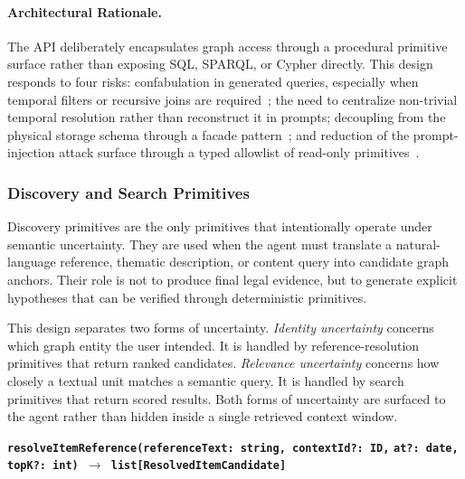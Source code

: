 \documentclass[11pt]{article}
\begin{document}
\paragraph{Architectural Rationale.}
The API deliberately encapsulates graph access through a procedural primitive surface rather than exposing SQL, SPARQL, or Cypher directly. This design responds to four risks: confabulation in generated queries, especially when temporal filters or recursive joins are required~\cite{pourreza2024dinsql}; the need to centralize non-trivial temporal resolution rather than reconstruct it in prompts; decoupling from the physical storage schema through a facade pattern~\cite{gamma1994design}; and reduction of the prompt-injection attack surface through a typed allowlist of read-only primitives~\cite{greshake2023more,perez2022ignore}.

\subsubsection{Discovery and Search Primitives}

Discovery primitives are the only primitives that intentionally operate under semantic uncertainty. They are used when the agent must translate a natural-language reference, thematic description, or content query into candidate graph anchors. Their role is not to produce final legal evidence, but to generate explicit hypotheses that can be verified through deterministic primitives.

This design separates two forms of uncertainty. \textit{Identity uncertainty} concerns which graph entity the user intended. It is handled by reference-resolution primitives that return ranked candidates. \textit{Relevance uncertainty} concerns how closely a textual unit matches a semantic query. It is handled by search primitives that return scored results. Both forms of uncertainty are surfaced to the agent rather than hidden inside a single retrieved context window.

\newpage
\vspace{0.3cm}
\noindent\textbf{\texttt{resolveItemReference(referenceText: string, contextId?: ID,}} \newline
\textbf{\texttt{at?: date, topK?: int) $\rightarrow$ list[ResolvedItemCandidate]}}
\end{document}
